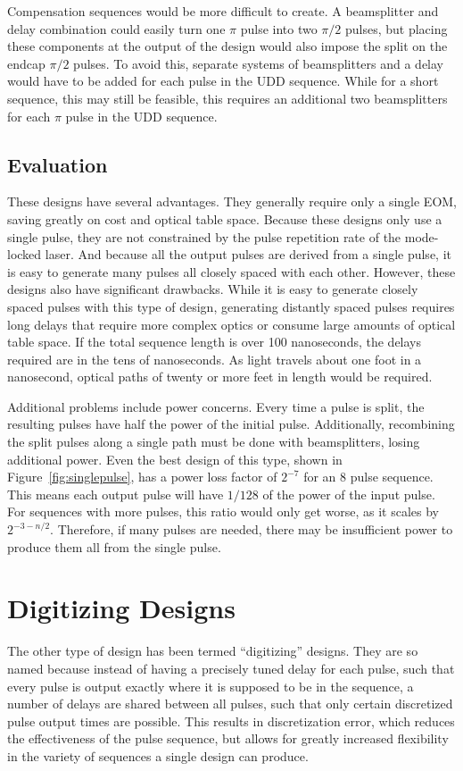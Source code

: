 \documentclass[pdftex,12pt,a4paper]{article}
\begin{document}
Compensation sequences would be more difficult to create. A beamsplitter and delay combination could easily turn one $\pi$ pulse into two $\pi/2$ pulses, but placing these components at the output of the design would also impose the split on the endcap $\pi/2$ pulses. To avoid this, separate systems of beamsplitters and a delay would have to be added for each pulse in the UDD sequence. While for a short sequence, this may still be feasible, this requires an additional two beamsplitters for each $\pi$ pulse in the UDD sequence.

\subsection{Evaluation}

These designs have several advantages. They generally require only a single EOM, saving greatly on cost and optical table space. Because these designs only use a single pulse, they are not constrained by the pulse repetition rate of the mode-locked laser. And because all the output pulses are derived from a single pulse, it is easy to generate many pulses all closely spaced with each other. However, these designs also have significant drawbacks. While it is easy to generate closely spaced pulses with this type of design, generating distantly spaced pulses requires long delays that require more complex optics or consume large amounts of optical table space. If the total sequence length is over 100 nanoseconds, the delays required are in the tens of nanoseconds. As light travels about one foot in a nanosecond, optical paths of twenty or more feet in length would be required. 

Additional problems include power concerns. Every time a pulse is split, the resulting pulses have half the power of the initial pulse. Additionally, recombining the split pulses along a single path must be done with beamsplitters, losing additional power. Even the best design of this type, shown in Figure~\ref{fig:singlepulse}, has a power loss factor of $2^{-7}$ for an 8 pulse sequence. This means each output pulse will have $1/128$ of the power of the input pulse. For sequences with more pulses, this ratio would only get worse, as it scales by $2^{-3-n/2}$. Therefore, if many pulses are needed, there may be insufficient power to produce them all from the single pulse.




\section{Digitizing Designs}
\label{sec:digitizing_designs}
The other type of design has been termed “digitizing” designs. They are so named because instead of having a precisely tuned delay for each pulse, such that every pulse is output exactly where it is supposed to be in the sequence, a number of delays are shared between all pulses, such that only certain discretized pulse output times are possible. This results in discretization error, which reduces the effectiveness of the pulse sequence, but allows for greatly increased flexibility in the variety of sequences a single design can produce.
\end{document}
